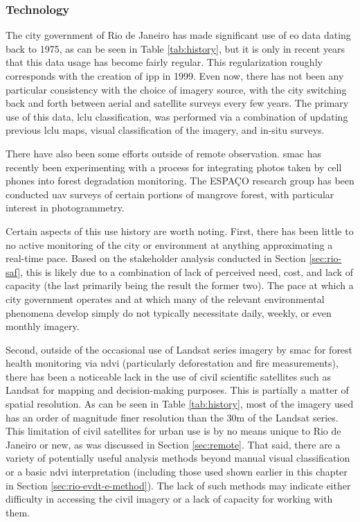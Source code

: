 \subsubsection{Technology} \label{sec:rio-evdt-tech-results}

The city government of Rio de Janeiro has made significant use of \ac{eo} data dating back to 1975, as can be seen in Table \ref{tab:history}, but it is only in recent years that this data usage has become fairly regular. This regularization roughly corresponds with the creation of \ac{ipp} in 1999. Even now, there has not been any particular consistency with the choice of imagery source, with the city switching back and forth between aerial and satellite surveys every few years. The primary use of this data, \acf{lclu} classification, was performed via a combination of updating previous \ac{lclu} maps, visual classification of the imagery, and in-situ surveys.

There have also been some efforts outside of remote observation. \ac{smac} has recently been experimenting with a process for integrating photos taken by cell phones into forest degradation monitoring. The ESPAÇO research group has been conducted \ac{uav} surveys of certain portions of mangrove forest, with particular interest in photogrammetry. 

Certain aspects of this use history are worth noting. First, there has been little to no active monitoring of the city or environment at anything approximating a real-time pace. Based on the stakeholder analysis conducted in Section \ref{sec:rio-saf}, this is likely due to a combination of lack of perceived need, cost, and lack of capacity (the last primarily being the result the former two). The pace at which a city government operates and at which many of the relevant environmental phenomena develop simply do not typically necessitate daily, weekly, or even monthly imagery.

Second, outside of the occasional use of Landsat series imagery by \ac{smac} for forest health monitoring via \ac{ndvi} (particularly deforestation and fire measurements), there has been a noticeable lack in the use of civil scientific satellites such as Landsat for mapping and decision-making purposes. This is partially a matter of spatial resolution. As can be seen in Table \ref{tab:history}, most of the imagery used has an order of magnitude finer resolution than the 30m of the Landsat series. This limitation of civil satellites for urban use is by no means unique to Rio de Janeiro or new, as was discussed in Section \ref{sec:remote}. That said, there are a variety of potentially useful analysis methods beyond manual visual classification or a basic \ac{ndvi} interpretation (including those used shown earlier in this chapter in Section \ref{sec:rio-evdt-e-method}). The lack of such methods may indicate either difficulty in accessing the civil imagery or a lack of capacity for working with them.

